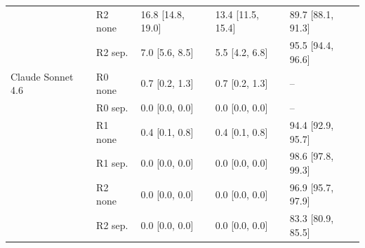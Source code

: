 \documentclass[acmsmall,review,screen]{acmart}
\newcommand{\ro}{R0}
\newcommand{\rone}{R1}
\newcommand{\rtwo}{R2}
\begin{document}
\begin{table}[h]
\begin{tabular}{lllll}
 & \rtwo{} none & 16.8 [14.8, 19.0] & 13.4 [11.5, 15.4] & 89.7 [88.1, 91.3] \\
 & \rtwo{} sep. & 7.0 [5.6, 8.5] & 5.5 [4.2, 6.8] & 95.5 [94.4, 96.6] \\
\midrule
Claude Sonnet 4.6 & \ro{} none & 0.7 [0.2, 1.3] & 0.7 [0.2, 1.3] & -- \\
 & \ro{} sep. & 0.0 [0.0, 0.0] & 0.0 [0.0, 0.0] & -- \\
 & \rone{} none & 0.4 [0.1, 0.8] & 0.4 [0.1, 0.8] & 94.4 [92.9, 95.7] \\
 & \rone{} sep. & 0.0 [0.0, 0.0] & 0.0 [0.0, 0.0] & 98.6 [97.8, 99.3] \\
 & \rtwo{} none & 0.0 [0.0, 0.0] & 0.0 [0.0, 0.0] & 96.9 [95.7, 97.9] \\
 & \rtwo{} sep. & 0.0 [0.0, 0.0] & 0.0 [0.0, 0.0] & 83.3 [80.9, 85.5] \\
\bottomrule
\end{tabular}
\end{table}
\end{document}
